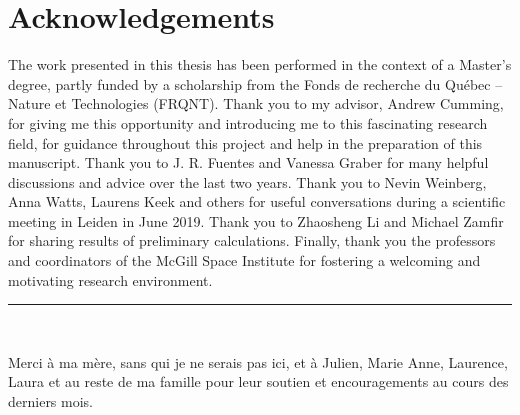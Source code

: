 \documentclass[../main.tex]{subfiles}
\begin{document}
\thispagestyle{empty}
\chapter*{Acknowledgements}

The work presented in this thesis has been performed in the context of a Master's degree, partly funded by a scholarship from the Fonds de recherche du Québec -- Nature et Technologies (FRQNT). Thank you to my advisor, Andrew Cumming, for giving me this opportunity and introducing me to this fascinating research field, for guidance throughout this project and help in the preparation of this manuscript. Thank you to J. R. Fuentes and Vanessa Graber for many helpful discussions and advice over the last two years. Thank you to Nevin Weinberg, Anna Watts, Laurens Keek and others for useful conversations during a scientific meeting in Leiden in June 2019. Thank you to Zhaosheng Li and Michael Zamfir for sharing results of preliminary calculations. Finally, thank you the professors and coordinators of the McGill Space Institute for fostering a welcoming and motivating research environment.\\
\begin{center}
    \vspace*{-1cm}\noindent\rule{0.2\textwidth}{0.1pt}\\
\end{center}
\noindent Merci à ma mère, sans qui je ne serais pas ici, et à Julien, Marie Anne, Laurence, Laura et au reste de ma famille pour leur soutien et encouragements au cours des derniers mois.
\end{document}
